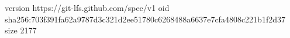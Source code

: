 version https://git-lfs.github.com/spec/v1
oid sha256:703f391fa62a9787d3c321d2ee51780c6268488a6637e7cfa4808c221b1f2d37
size 2177
